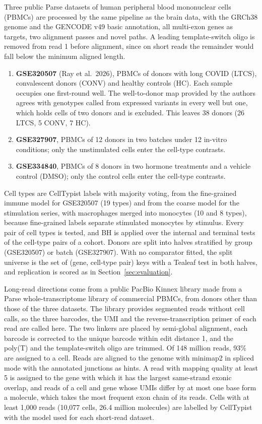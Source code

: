 \documentclass[11pt]{article}
\begin{document}
Three public Parse datasets of human peripheral blood mononuclear cells (PBMCs) are processed by the same pipeline as the brain data, with the GRCh38 genome and the GENCODE v49 basic annotation, all multi-exon genes as targets, two alignment passes and novel paths. A leading template-switch oligo is removed from read 1 before alignment, since on short reads the remainder would fall below the minimum aligned length.
\begin{enumerate}[leftmargin=*]
  \item \textbf{GSE320507} (Ray et al.\ 2026), PBMCs of donors with long COVID (LTCS), convalescent donors (CONV) and healthy controls (HC). Each sample occupies one first-round well. The well-to-donor map provided by the authors agrees with genotypes called from expressed variants in every well but one, which holds cells of two donors and is excluded. This leaves 38 donors (26 LTCS, 5 CONV, 7 HC).
  \item \textbf{GSE327907}, PBMCs of 12 donors in two batches under 12 in-vitro conditions; only the unstimulated cells enter the cell-type contrasts.
  \item \textbf{GSE334840}, PBMCs of 8 donors in two hormone treatments and a vehicle control (DMSO); only the control cells enter the cell-type contrasts.
\end{enumerate}
Cell types are CellTypist labels with majority voting, from the fine-grained immune model for GSE320507 (19 types) and from the coarse model for the stimulation series, with macrophages merged into monocytes (10 and 8 types), because fine-grained labels separate stimulated monocytes by stimulus. Every pair of cell types is tested, and BH is applied over the internal and terminal tests of the cell-type pairs of a cohort. Donors are split into halves stratified by group (GSE320507) or batch (GSE327907). With no comparator fitted, the split universe is the set of (gene, cell-type pair) keys with a Tealeaf test in both halves, and replication is scored as in Section~\ref{sec:evaluation}.

Long-read directions come from a public PacBio Kinnex library made from a Parse whole-transcriptome library of commercial PBMCs, from donors other than those of the three datasets. The library provides segmented reads without cell calls, so the three barcodes, the UMI and the reverse-transcription primer of each read are called here. The two linkers are placed by semi-global alignment, each barcode is corrected to the unique barcode within edit distance 1, and the poly(T) and the template-switch oligo are trimmed. Of 148 million reads, 93\% are assigned to a cell. Reads are aligned to the genome with minimap2 in spliced mode with the annotated junctions as hints. A read with mapping quality at least 5 is assigned to the gene with which it has the largest same-strand exonic overlap, and reads of a cell and gene whose UMIs differ by at most one base form a molecule, which takes the most frequent exon chain of its reads. Cells with at least 1{,}000 reads (10{,}077 cells, 26.4 million molecules) are labelled by CellTypist with the model used for each short-read dataset.
\end{document}
